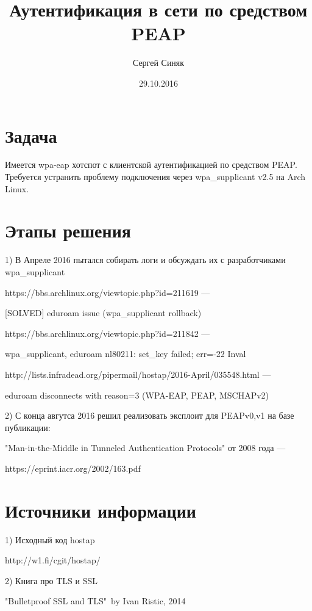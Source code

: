 \documentclass[unicode]{beamer}
\title{Аутентификация в сети по средством PEAP}
\author{Сергей Синяк}
\date{29.10.2016}
\begin{document}
\begin{frame}
  \titlepage
\end{frame}

\section{Задача}
\begin{frame}
  Имеется wpa-eap хотспот с клиентской аутентификацией
  по средством PEAP. Требуется устранить проблему подключения
  через wpa\_supplicant v2.5 на Arch Linux.
\end{frame}

\section{Этапы решения}
\begin{frame}
  1) В Апреле 2016 пытался собирать логи и обсуждать их с разработчиками
    wpa\_supplicant

    https://bbs.archlinux.org/viewtopic.php?id=211619 ---

    [SOLVED] eduroam issue (wpa\_supplicant rollback)

    https://bbs.archlinux.org/viewtopic.php?id=211842 ---

    wpa\_supplicant, eduroam nl80211: set\_key failed; err=-22 Inval

    http://lists.infradead.org/pipermail/hostap/2016-April/035548.html ---

    eduroam disconnects with reason=3 (WPA-EAP, PEAP, MSCHAPv2)
\end{frame}

\begin{frame}
  2) С конца авгутса 2016 решил реализовать эксплоит для PEAPv0,v1
    на базе публикации:

    "Man-in-the-Middle in Tunneled Authentication Protocols"
    от 2008 года ---

    https://eprint.iacr.org/2002/163.pdf
\end{frame}

\section{Источники информации}
\begin{frame}
  1) Исходный код hostap

  http://w1.fi/cgit/hostap/

  2) Книга про TLS и SSL

  "Bulletproof SSL and TLS"\ by Ivan Ristic, 2014
\end{frame}
\end{document}
